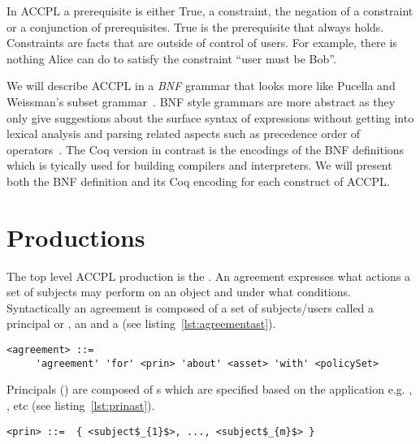 In \ac{ACCPL} a prerequisite is either True, a constraint, the negation of a constraint or a conjunction of prerequisites. True is the prerequisite that always holds. Constraints are facts that are outside of control of users. For example, there is nothing Alice can do to satisfy the constraint ``user must be Bob''. 


We will describe \ac{ACCPL} in a \emph{BNF} grammar that looks more like Pucella and Weissman's subset grammar~\cite{pucella2006}. BNF style grammars are more abstract as they only give suggestions about the surface syntax of expressions without getting into lexical analysis and parsing related aspects such as precedence order of operators~\cite{piercesf2011}. The Coq version in contrast is the encodings of the BNF definitions which is tyically used for building compilers and interpreters. We will present both the BNF definition and its Coq encoding for each construct of \ac{ACCPL}. 


\section{Productions} \label{sec:productionast}

The top level \ac{ACCPL} production is the . An agreement expresses what actions a set of subjects may perform on an object and under what conditions. Syntactically an agreement is composed of a set of subjects/users called a principal or , an  and a  (see listing~\ref{lst:agreementast}).

\lstset{language=AST}
\begin{minipage}[c]{0.95\textwidth}
\begin{lstlisting}[frame=single, caption={agreement},label={lst:agreementast}]
<agreement> ::= 
     'agreement' 'for' <prin> 'about' <asset> 'with' <policySet> 
\end{lstlisting}
\end{minipage} 

Principals () are composed of s which are specified based on the application e.g. , , etc (see listing~\ref{lst:prinast}).

\lstset{mathescape, language=AST}  
\begin{lstlisting}[frame=single, caption={prin},label={lst:prinast}]
<prin> ::=  { <subject$_{1}$>, ..., <subject$_{m}$> }
\end{lstlisting}

